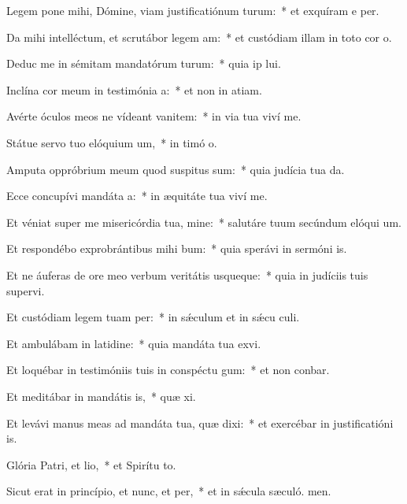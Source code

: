 \item Legem pone mihi, Dómine, viam justificatiónum turum:~* et exquíram e per.
\item Da mihi intelléctum, et scrutábor legem am:~* et custódiam illam in toto cor o.
\item Deduc me in sémitam mandatórum turum:~* quia ip lui.
\item Inclína cor meum in testimónia a:~* et non in atiam.
\item Avérte óculos meos ne vídeant vanitem:~* in via tua viví me.
\item Státue servo tuo elóquium um,~* in timó o.
\item Amputa oppróbrium meum quod suspitus sum:~* quia judícia tua da.
\item Ecce concupívi mandáta a:~* in æquitáte tua viví me.
\item Et véniat super me misericórdia tua, mine:~* salutáre tuum secúndum elóqui um.
\item Et respondébo exprobrántibus mihi bum:~* quia sperávi in sermóni is.
\item Et ne áuferas de ore meo verbum veritátis usqueque:~* quia in judíciis tuis supervi.
\item Et custódiam legem tuam per:~* in sǽculum et in sǽcu culi.
\item Et ambulábam in latidine:~* quia mandáta tua exvi.
\item Et loquébar in testimóniis tuis in conspéctu gum:~* et non conbar.
\item Et meditábar in mandátis is,~* quæ xi.
\item Et levávi manus meas ad mandáta tua, quæ dixi:~* et exercébar in justificatióni is.
\item Glória Patri, et lio,~* et Spirítu to.
\item Sicut erat in princípio, et nunc, et per,~* et in sǽcula sæculó. men.
